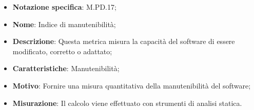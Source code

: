 \begin{itemize}
    \item \textbf{Notazione specifica}: M.PD.17;
    \item \textbf{Nome}: Indice di manutenibilità;
    \item \textbf{Descrizione}: Questa metrica misura la capacità del software di essere modificato, corretto o adattato;
    \item \textbf{Caratteristiche}: Manutenibilità;
    \item \textbf{Motivo}: Fornire una misura quantitativa della manutenibilità del software;
    \item \textbf{Misurazione}: Il calcolo viene effettuato con strumenti di analisi statica.
\end{itemize}
